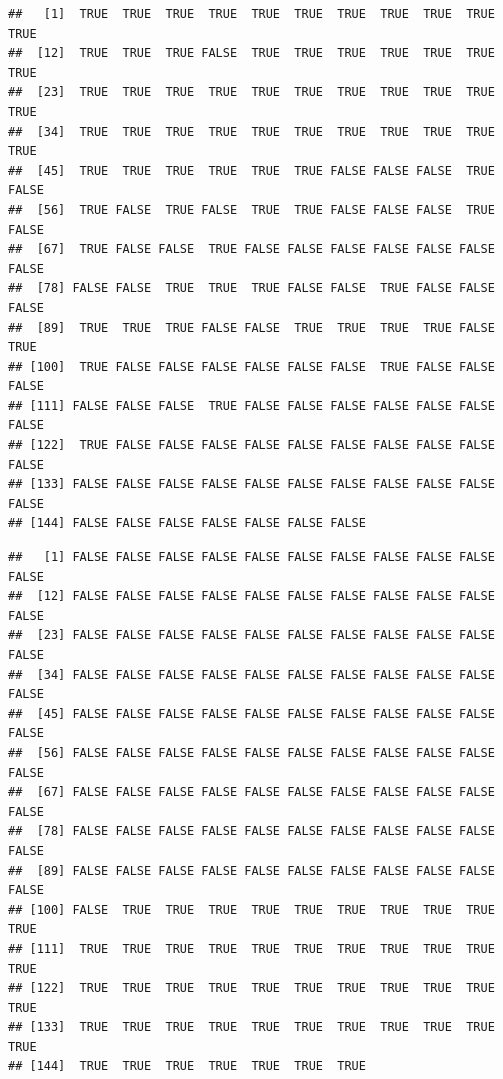 \documentclass[]{book}
\newenvironment{Shaded}{\begin{snugshade}}{\end{snugshade}}
\newcommand{\CommentTok}[1]{\textcolor[rgb]{0.56,0.35,0.01}{\textit{#1}}}
\newcommand{\NormalTok}[1]{#1}
\newcommand{\OperatorTok}[1]{\textcolor[rgb]{0.81,0.36,0.00}{\textbf{#1}}}
\newcommand{\StringTok}[1]{\textcolor[rgb]{0.31,0.60,0.02}{#1}}
\begin{document}
\begin{verbatim}
##   [1]  TRUE  TRUE  TRUE  TRUE  TRUE  TRUE  TRUE  TRUE  TRUE  TRUE  TRUE
##  [12]  TRUE  TRUE  TRUE FALSE  TRUE  TRUE  TRUE  TRUE  TRUE  TRUE  TRUE
##  [23]  TRUE  TRUE  TRUE  TRUE  TRUE  TRUE  TRUE  TRUE  TRUE  TRUE  TRUE
##  [34]  TRUE  TRUE  TRUE  TRUE  TRUE  TRUE  TRUE  TRUE  TRUE  TRUE  TRUE
##  [45]  TRUE  TRUE  TRUE  TRUE  TRUE  TRUE FALSE FALSE FALSE  TRUE FALSE
##  [56]  TRUE FALSE  TRUE FALSE  TRUE  TRUE FALSE FALSE FALSE  TRUE FALSE
##  [67]  TRUE FALSE FALSE  TRUE FALSE FALSE FALSE FALSE FALSE FALSE FALSE
##  [78] FALSE FALSE  TRUE  TRUE  TRUE FALSE FALSE  TRUE FALSE FALSE FALSE
##  [89]  TRUE  TRUE  TRUE FALSE FALSE  TRUE  TRUE  TRUE  TRUE FALSE  TRUE
## [100]  TRUE FALSE FALSE FALSE FALSE FALSE FALSE  TRUE FALSE FALSE FALSE
## [111] FALSE FALSE FALSE  TRUE FALSE FALSE FALSE FALSE FALSE FALSE FALSE
## [122]  TRUE FALSE FALSE FALSE FALSE FALSE FALSE FALSE FALSE FALSE FALSE
## [133] FALSE FALSE FALSE FALSE FALSE FALSE FALSE FALSE FALSE FALSE FALSE
## [144] FALSE FALSE FALSE FALSE FALSE FALSE FALSE
\end{verbatim}

\begin{Shaded}
\end{Shaded}

\begin{verbatim}
##   [1] FALSE FALSE FALSE FALSE FALSE FALSE FALSE FALSE FALSE FALSE FALSE
##  [12] FALSE FALSE FALSE FALSE FALSE FALSE FALSE FALSE FALSE FALSE FALSE
##  [23] FALSE FALSE FALSE FALSE FALSE FALSE FALSE FALSE FALSE FALSE FALSE
##  [34] FALSE FALSE FALSE FALSE FALSE FALSE FALSE FALSE FALSE FALSE FALSE
##  [45] FALSE FALSE FALSE FALSE FALSE FALSE FALSE FALSE FALSE FALSE FALSE
##  [56] FALSE FALSE FALSE FALSE FALSE FALSE FALSE FALSE FALSE FALSE FALSE
##  [67] FALSE FALSE FALSE FALSE FALSE FALSE FALSE FALSE FALSE FALSE FALSE
##  [78] FALSE FALSE FALSE FALSE FALSE FALSE FALSE FALSE FALSE FALSE FALSE
##  [89] FALSE FALSE FALSE FALSE FALSE FALSE FALSE FALSE FALSE FALSE FALSE
## [100] FALSE  TRUE  TRUE  TRUE  TRUE  TRUE  TRUE  TRUE  TRUE  TRUE  TRUE
## [111]  TRUE  TRUE  TRUE  TRUE  TRUE  TRUE  TRUE  TRUE  TRUE  TRUE  TRUE
## [122]  TRUE  TRUE  TRUE  TRUE  TRUE  TRUE  TRUE  TRUE  TRUE  TRUE  TRUE
## [133]  TRUE  TRUE  TRUE  TRUE  TRUE  TRUE  TRUE  TRUE  TRUE  TRUE  TRUE
## [144]  TRUE  TRUE  TRUE  TRUE  TRUE  TRUE  TRUE
\end{verbatim}
\end{document}
